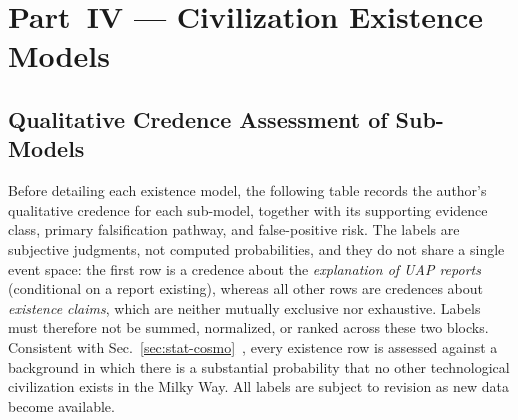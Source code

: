 \documentclass[aps,prd,twocolumn,superscriptaddress,nofootinbib]{revtex4-2}
\begin{document}
\section{Part~IV --- Civilization Existence Models}\label{sec:part4}

\subsection{Qualitative Credence Assessment of Sub-Models}\label{sec:bayesian-priors}

Before detailing each existence model, the following table records the author's qualitative credence for each sub-model, together with its supporting evidence class, primary falsification pathway, and false-positive risk. The labels are subjective judgments, not computed probabilities, and they do not share a single event space: the first row is a credence about the \textit{explanation of UAP reports} (conditional on a report existing), whereas all other rows are credences about \textit{existence claims}, which are neither mutually exclusive nor exhaustive. Labels must therefore not be summed, normalized, or ranked across these two blocks. Consistent with Sec.~\ref{sec:stat-cosmo}~\cite{Sandberg2018}, every existence row is assessed against a background in which there is a substantial probability that no other technological civilization exists in the Milky Way. All labels are subject to revision as new data become available.
\end{document}
